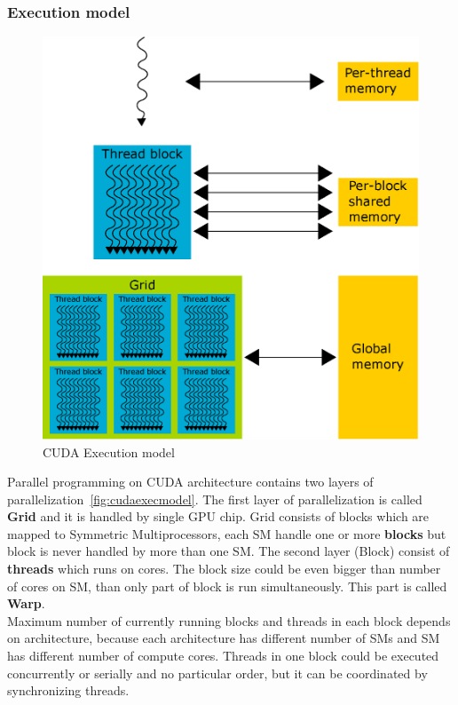 \subsubsection{Execution model}

\begin{figure}[h]
  \centering
  \includegraphics[width=0.8\linewidth]{img/CUDAExecutionModel.eps}
  \caption{CUDA Execution model}
  \label{fig:cudaexecmodel}
\end{figure}%

Parallel programming on CUDA architecture contains two layers of parallelization~\autoref{fig:cudaexecmodel}. The first layer of parallelization is called \textbf{Grid} and it is handled by single GPU chip. Grid consists of blocks which are mapped to Symmetric Multiprocessors, each SM handle one or more \textbf{blocks} but block is never handled by more than one SM. The second layer (Block) consist of \textbf{threads} which runs on cores. The block size could be even bigger than number of cores on SM, than only part of block is run simultaneously. This part is called \textbf{Warp}.\\ Maximum number of currently running blocks and threads in each block depends on architecture, because each architecture has different number of SMs and SM has different number of compute cores. Threads in one block could be executed concurrently or serially and no particular order, but it can be coordinated by synchronizing threads.\\

